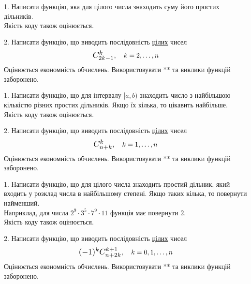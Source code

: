 \documentclass[12pt, ukrainian]{article}
\begin{document}
\begin{Large}



1. Написати функцію, яка для цілого числа знаходить суму його простих дільників.\\	Якість коду також оцінюється. 



\vspace{10mm}

\newpage

2. 
Написати функцію, що виводить послідовність \underline{цілих} чисел
$$\scalebox{1.2}{$C_{2k-1}^{k}$}, \quad k=2,\ldots,n$$
Оцінюється економність обчислень. Використовувати ** та виклики функцій заборонено.

\newpage




1. Написати функцію, що для інтервалу $[a, b)$ знаходить число з найбільшою кількістю різних простих дільників. Якщо їх кілька, то цікавить найбільше.\\	Якість коду також оцінюється. 



\vspace{10mm}

\newpage

2. 
Написати функцію, що виводить послідовність \underline{цілих} чисел
$$\scalebox{1.2}{$C_{n+k}^{k}$}, \quad k=1,\ldots,n$$
Оцінюється економність обчислень. Використовувати ** та виклики функцій заборонено.

\newpage




1. Написати функцію, що для цілого числа знаходить простий дільник, який входить у розклад числа в найбільшому степені. Якщо таких кілька, то повернути найменший. \\ Наприклад, для числа $2^{9}{\cdot}3^5{\cdot}7^9{\cdot}11$ функція має повернути $2$.\\	Якість коду також оцінюється. 



\vspace{10mm}

\newpage

2. 
Написати функцію, що виводить послідовність \underline{цілих} чисел
$$\scalebox{1.2}{$(-1)^{k}C_{n+2k}^{k+1}$}, \quad k=0,1,\ldots,n$$
Оцінюється економність обчислень. Використовувати ** та виклики функцій заборонено.


\end{Large}
\end{document}

